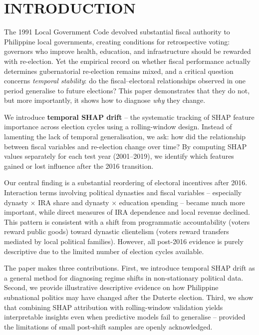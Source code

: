 \documentclass[conference]{IEEEtran}
\begin{document}
\section{INTRODUCTION}

The 1991 Local Government Code devolved substantial fiscal authority to Philippine local governments, creating conditions for retrospective voting: governors who improve health, education, and infrastructure should be rewarded with re-election. Yet the empirical record on whether fiscal performance actually determines gubernatorial re-election remains mixed, and a critical question concerns \emph{temporal stability}: do the fiscal--electoral relationships observed in one period generalise to future elections? This paper demonstrates that they do not, but more importantly, it shows how to diagnose \emph{why} they change.

We introduce \textbf{temporal SHAP drift} – the systematic tracking of SHAP feature importance across election cycles using a rolling-window design. Instead of lamenting the lack of temporal generalisation, we ask: how did the relationship between fiscal variables and re-election change over time? By computing SHAP values separately for each test year (2001–2019), we identify which features gained or lost influence after the 2016 transition.

Our central finding is a substantial reordering of electoral incentives after 2016. Interaction terms involving political dynasties and fiscal variables – especially dynasty $\times$ IRA share and dynasty $\times$ education spending – became much more important, while direct measures of IRA dependence and local revenue declined. This pattern is consistent with a shift from programmatic accountability (voters reward public goods) toward dynastic clientelism (voters reward transfers mediated by local political families). However, all post-2016 evidence is purely descriptive due to the limited number of election cycles available.

The paper makes three contributions. First, we introduce temporal SHAP drift as a general method for diagnosing regime shifts in non-stationary political data. Second, we provide illustrative descriptive evidence on how Philippine subnational politics may have changed after the Duterte election. Third, we show that combining SHAP attribution with rolling-window validation yields interpretable insights even when predictive models fail to generalise – provided the limitations of small post-shift samples are openly acknowledged.
\end{document}
